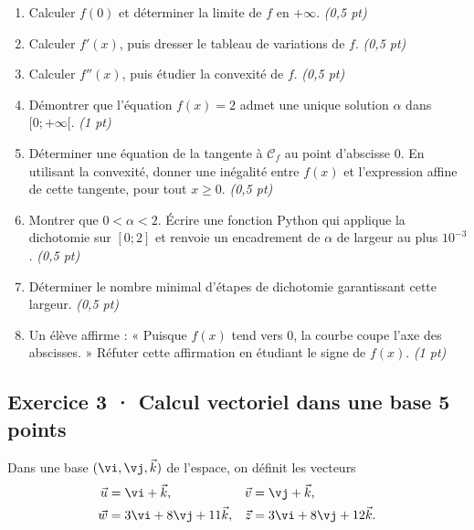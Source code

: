 \begin{enumerate}

\item Calculer $f(0)$ et déterminer la limite de $f$ en $+\infty$. \hfill\textit{(0,5 pt)}

\item Calculer $f' (x)$, puis dresser le tableau de variations de $f$. \hfill\textit{(0,5 pt)}

\item Calculer $f'' (x)$, puis étudier la convexité de $f$. \hfill\textit{(0,5 pt)}

\item Démontrer que l'équation $f(x)=2$ admet une unique solution $\alpha$ dans $[0;+\infty[$. \hfill\textit{(1 pt)}

\item Déterminer une équation de la tangente à $\mathcal C_f$ au point d'abscisse $0$. En utilisant la convexité, donner une inégalité entre $f(x)$ et l'expression affine de cette tangente, pour tout $x\ge0$. \hfill\textit{(0,5 pt)}

\item Montrer que $0<\alpha<2$. Écrire une fonction Python qui applique la dichotomie sur $[0;2]$ et renvoie un encadrement de $\alpha$ de largeur au plus $10^{-3}$. \hfill\textit{(0,5 pt)}

\item Déterminer le nombre minimal d'étapes de dichotomie garantissant cette largeur. \hfill\textit{(0,5 pt)}

\item Un élève affirme : « Puisque $f(x)$ tend vers $0$, la courbe coupe l'axe des abscisses. » Réfuter cette affirmation en étudiant le signe de $f(x)$. \hfill\textit{(1 pt)}

\end{enumerate}

\clearpage{}\par

\subsection*{Exercice 3 · Calcul vectoriel dans une base \hfill 5 points}Dans une base $(\vi,\vj,\vec k)$ de l'espace, on définit les vecteurs
\[\begin{aligned}\vec u&=\vi+\vec k,&\vec v&=\vj+\vec k,\\
\vec w&=3\vi+8\vj+11\vec k,&\vec z&=3\vi+8\vj+12\vec k.\end{aligned}\]

